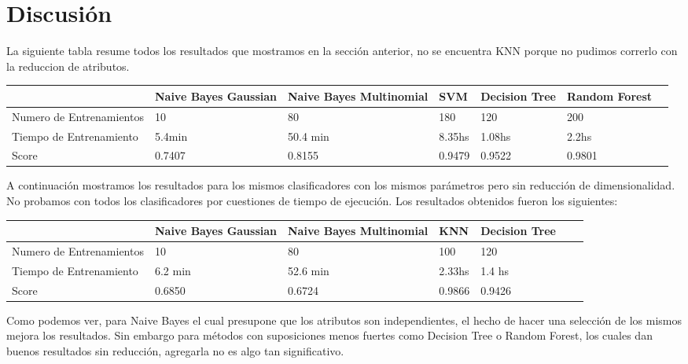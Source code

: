\section{Discusión}

La siguiente tabla resume todos los resultados que mostramos en la sección anterior, no se encuentra KNN porque no pudimos correrlo con la reduccion de atributos.

\begin{center}
    \begin{tabular}{ | p{3cm} | p{2cm} | p{2.2cm} | p{1.5cm} | p{1.5cm} | p{2cm} | p{2cm} |}
    \hline
     & Naive Bayes Gaussian & Naive Bayes Multinomial & SVM & Decision Tree & Random Forest\\ \hline
    Numero de Entrenamientos & 10     &  80      & 180    & 120    &  200      \\ \hline
    Tiempo de Entrenamiento  & 5.4min & 50.4 min & 8.35hs & 1.08hs &  2.2hs    \\ \hline
    Score                    & 0.7407 & 0.8155   & 0.9479 & 0.9522 & 0.9801    \\ \hline
    \end{tabular}
\end{center} 

A continuación mostramos los resultados para los mismos clasificadores con los mismos parámetros pero sin reducción de dimensionalidad. No probamos con todos los clasificadores por cuestiones de tiempo de ejecución. Los resultados obtenidos fueron los siguientes:

\begin{center}
    \begin{tabular}{ | p{3cm} | p{2cm} | p{2.2cm} | p{1.5cm} | p{1.5cm} | p{2cm} | p{2cm} |}
    \hline
     & Naive Bayes Gaussian & Naive Bayes Multinomial & KNN & Decision Tree \\ \hline
    Numero de Entrenamientos & 10      & 80       &  100     & 120        \\ \hline
    Tiempo de Entrenamiento  & 6.2 min & 52.6 min &  2.33hs  & 1.4 hs   \\ \hline
    Score                    & 0.6850  & 0.6724   &  0.9866  & 0.9426   \\ \hline
    \end{tabular}
\end{center} 


Como podemos ver, para Naive Bayes el cual presupone que los atributos son independientes, el hecho de hacer una selección de los mismos mejora los resultados. Sin embargo para métodos con suposiciones menos fuertes como Decision Tree o Random Forest, los cuales dan buenos resultados sin reducción, agregarla no es algo tan significativo.\\

